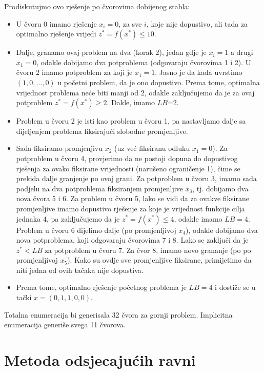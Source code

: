 \documentclass[a4paper, utf8, 11pt, colorlinks]{book}
\theoremstyle{definition}
\begin{document}
Prodiskutujmo ovo rješenje po čvorovima dobijenog stabla:
  \begin{itemize}
      \item U čvoru 0 imamo  rješenje $x_i = 0$, za sve $i$, koje  nije dopustivo, ali  tada za optimalno rješenje vrijedi $z^*=f(x^*) \leq 10$.
      \item  Dalje, granamo ovaj problem na dva (korak 2), jedan gdje je $x_i=1$ a drugi $x_1=0$, odakle dobijamo dva potproblema (odgovaraju čvorovima 1 i 2). U čvoru 2 imamo potproblem za koji je $x_1=1$. Jasno je da kada uvrstimo $(1,0, \ldots, 0)$ u početni problem, da je ono dopustivo. Prema tome, optimalna vrijednost problema neće biti manji od 2, odakle zaključujemo da je za ovaj potproblem $z^*=f(x^*) \geq 2$. Dakle, imamo $LB$=2. 
      \item Problem u čvoru 2 je isti kao problem u čvoru 1, pa nastavljamo dalje sa dijeljenjem problema fiksirajući slobodne promjenljive. 
      \item Sada fiksiramo promjenjivu $x_2$ (uz već fiksiranu odluku $x_1=0$). 
            Za potproblem u čvoru 4, provjerimo da ne postoji dopuna do dopustivog rješenja za ovako fiksirane vrijednosti (narušeno ograničenje 1), čime se prekida dalje granjenje po ovoj grani. Za potproblem u čvoru 3, imamo sada podjelu na dva potproblema fiksiranjem promjenljive $x_3$, tj. dobijamo dva   nova čvora 5 i 6. Za problem u čvoru 5, lako se vidi da za ovakve fiksirane promjenljive imamo dopustivo rješenje za koje je vrijednost funkcije cilja jednaka 4, pa zaključujemo da je $z^*=f(x^*) \leq 4$, odakle imamo $LB=4$. Problem u čvoru 6 dijelimo dalje (po promjenljivoj $x_4$), odakle dobijamo dva nova potproblema, koji odgovaraju čvorovima 7 i 8. Lako se zaključi da je $z^*<LB$ za   potproblem u čvoru 7.  Za čvor 8, imamo novo grananje (po po promjenljivoj $x_5$). Kako su ovdje sve promjenljive fiksirane, primijetimo da niti jedna od ovih tačaka  nije dopustiva.
            \item Prema tome, optimalno rješenje početnog problema je $LB=4$ i dostiže se u tački $x=(0, 1, 1, 0, 0)$. 
  \end{itemize}
  Totalna enumeracija bi generisala 32 čvora za gornji problem. Implicitna enumeracija generiše svega 11 čvorova. 
 
\section{Metoda odsjecajućih ravni}
  
\end{document}
